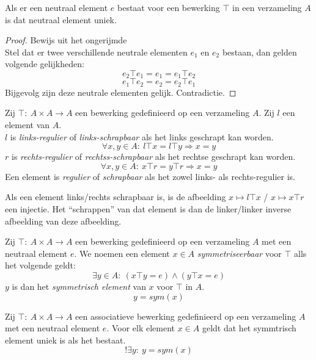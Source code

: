 \documentclass[main.tex]{subfiles}
\begin{document}
\begin{st}
  \label{st:neutraal-element-uniek}
  Als er een neutraal element $e$ bestaat voor een bewerking $\top$ in een verzameling $A$ is dat neutraal element uniek.
  \begin{proof}
    Bewijs uit het ongerijmde\\
    Stel dat er twee verschillende neutrale elementen $e_{1}$ en $e_{2}$ bestaan, dan gelden volgende gelijkheden:    \[ e_{2}\top e_{1} = e_{1}  =e_{1}\top e_{2}\]
    \[ e_{1}\top e_{2} = e_{2}  =e_{2}\top e_{1}\]
    Bijgevolg zijn deze neutrale elementen gelijk. Contradictie.
  \end{proof}
\end{st}

\begin{de}
  Zij $\top:\ A\times A\rightarrow A$ een bewerking gedefinieerd op een verzameling $A$.
  Zij $l$ een element van $A$.\\
  $l$ is \emph{links-regulier} of \emph{links-schrapbaar} als het links geschrapt kan worden.
  \[ \forall x,y \in A:\ l \top x = l \top y \Rightarrow x = y \]
  $r$ is \emph{rechts-regulier} of \emph{rechtss-schrapbaar} als het rechtse geschrapt kan worden.
  \[ \forall x,y \in A:\ x \top r = y \top r \Rightarrow x = y \]
  Een element is \emph{regulier} of \emph{schrapbaar} als het zowel links- als rechts-regulier is. 
\end{de}

\begin{opm}
  Als een element links/rechts schrapbaar is, is de afbeelding $x \mapsto l\top x$ / $x \mapsto x\top r$ een injectie. Het ``schrappen'' van dat element is dan de linker/linker inverse afbeelding van deze afbeelding.
\end{opm}

\begin{de}
  Zij $\top:\ A\times A\rightarrow A$ een bewerking gedefinieerd op een verzameling $A$ met een neutraal element $e$.
  We noemen een element $x\in A$ \emph{symmetriseerbaar} voor $\top$ alls het volgende geldt:
  \[ \exists y \in A:\ (x \top y = e) \wedge (y \top x = e) \]
  $y$ is dan het \emph{symmetrisch element} van $x$ voor $\top$ in $A$.
  \[ y = sym(x) \]
\end{de}

\begin{st}
  Zij $\top:\ A\times A\rightarrow A$ een associatieve bewerking gedefinieerd op een verzameling $A$ met een neutraal element $e$.
  Voor elk element $x \in A$ geldt dat het symmtrisch element uniek is als het bestaat.
  \[ !\exists y:\ y = sym(x) \]

\end{st}
\end{document}
